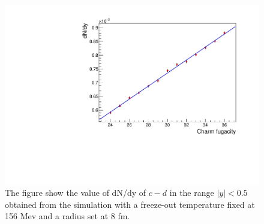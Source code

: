\documentclass[12pt,a4paper]{book}
\begin{document}
		\begin{figure}
			\centering
		\includegraphics[width=0.7 \linewidth]{pictures/var_fugacity.pdf}
		\caption{The figure show the value of dN/dy of $c-d$ in the range $|y|<0.5$ obtained from the simulation with a freeze-out temperature fixed at 156 Mev and a radius set at 8 fm. }
		\label{fig:var_fugacity}
	\end{figure}
	
\end{document}
